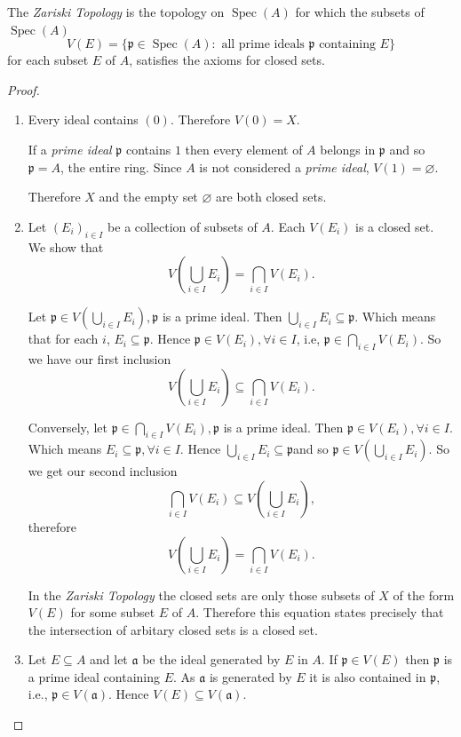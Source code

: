 \documentclass[]{report}
\DeclareMathOperator\Spec{Spec}
\begin{document}
The \textit{Zariski Topology} is the topology on $\Spec(A)$ for which the subsets of $\Spec(A)$
$$V(E) = \{\mathfrak{p}\in \Spec(A): \text{ all prime ideals } \mathfrak{p} \text{ containing } E\}$$
 for each subset $E$ of $A$, satisfies the axioms for closed sets. 
\begin{proof}
\begin{enumerate}
    \item Every ideal contains $(0)$. Therefore $V(0) = X$.

        If a \textit{prime ideal} $\mathfrak{p}$ contains $1$ then every element of $A$ belongs in $\mathfrak{p}$ and so $\mathfrak{p} = A$, the entire ring. Since $A$ is not considered a \textit{prime ideal}, $V(1) = \varnothing$. 
        
        Therefore $X$ and the empty set $\varnothing$ are both closed sets.
    \item Let $(E_i)_{i \in I}$ be a collection of subsets of $A$. Each $V(E_i)$ is a closed set. We show that 
        $$V(\bigcup_{i \in I} E_i) = \bigcap_{i \in I} V(E_i).$$

        Let $\mathfrak{p} \in V(\bigcup_{i \in I} E_i), \mathfrak{p}$ is a prime ideal. Then $\bigcup_{i \in I} E_i \subseteq \mathfrak{p}$. Which means that for each $i$, $E_i \subseteq \mathfrak{p}$. Hence $\mathfrak{p} \in V(E_i), \forall i \in I$, i.e, $\mathfrak{p} \in \bigcap_{i \in I} V(E_i)$. So we have our first inclusion
        $$V(\bigcup_{i \in I} E_i) \subseteq \bigcap_{i \in I} V(E_i).$$
        
        Conversely, let $\mathfrak{p} \in \bigcap_{i \in I} V(E_i), \mathfrak{p}$ is a prime ideal. Then $\mathfrak{p} \in V(E_i), \forall i \in I$. Which means $E_i \subseteq \mathfrak{p}, \forall i \in I$. Hence $\bigcup_{i \in I} E_i \subseteq \mathfrak{p}$and so $\mathfrak{p} \in V(\bigcup_{i \in I} E_i)$. So we get our second inclusion
        $$\bigcap_{i \in I} V(E_i) \subseteq V(\bigcup_{i \in I} E_i),$$
        therefore
        $$V(\bigcup_{i \in I} E_i) = \bigcap_{i \in I} V(E_i).$$

        In the \textit{Zariski Topology} the closed sets are only those subsets of $X$ of the form $V(E)$ for some subset $E$ of $A$. Therefore this equation states precisely that the intersection of arbitary closed sets is a closed set.
    \item Let $E \subseteq A$ and let $\mathfrak{a}$ be the ideal generated by $E$ in $A$. If $\mathfrak{p} \in V(E)$ then $\mathfrak{p}$ is a prime ideal containing $E$. As $\mathfrak{a}$ is generated by $E$ it is also contained in $\mathfrak{p}$, i.e., $\mathfrak{p} \in V(\mathfrak{a})$. Hence $V(E) \subseteq V(\mathfrak{a})$.


\end{enumerate}
\end{proof}
\end{document}
